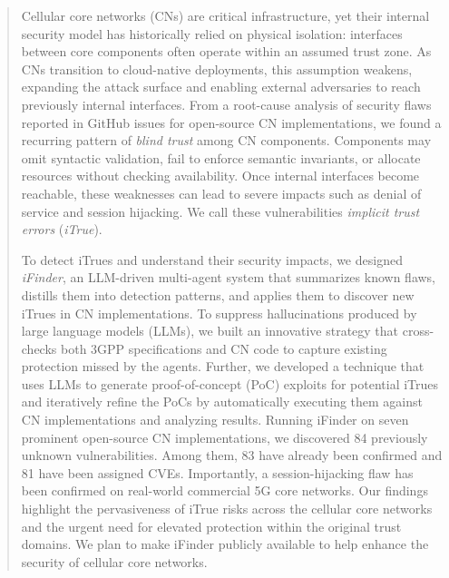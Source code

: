\begin{abstract}

Cellular core networks (CNs) are critical infrastructure, yet their internal security model has historically relied on physical isolation: interfaces between core components often operate within an assumed trust zone. As CNs transition to cloud-native deployments, this assumption weakens, expanding the attack surface and enabling external adversaries to reach previously internal interfaces.
From a root-cause analysis of security flaws reported in GitHub issues for open-source CN implementations, we found a recurring pattern of \textit{blind trust} among CN components. Components may omit syntactic validation, fail to enforce semantic invariants, or allocate resources without checking availability. Once internal interfaces become reachable, these weaknesses can lead to severe impacts such as denial of service and session hijacking. We call these vulnerabilities \textit{implicit trust errors} (\textit{iTrue}).

To detect iTrues and understand their security impacts, we designed \textit{iFinder}, an LLM-driven multi-agent system that summarizes known flaws, distills them into detection patterns, and applies them to discover new iTrues in CN implementations. 
To suppress hallucinations produced by large language models (LLMs), we built an innovative strategy that cross-checks both 3GPP specifications and CN code to capture existing protection missed by the agents. Further, we developed a technique that uses LLMs to generate proof-of-concept (PoC) exploits for potential iTrues and iteratively refine the PoCs by automatically executing them against CN implementations and analyzing results. 
Running iFinder on seven prominent open-source CN implementations, we discovered 84 previously unknown vulnerabilities. Among them, 83 have already been confirmed and 81 have been assigned CVEs. 
Importantly, a session-hijacking flaw has been confirmed on real-world commercial 5G core networks. Our findings highlight the pervasiveness of iTrue risks across the cellular core networks and the urgent need for elevated protection within the original trust domains. We plan to make iFinder publicly available to help enhance the security of cellular core networks. 
\end{abstract}
